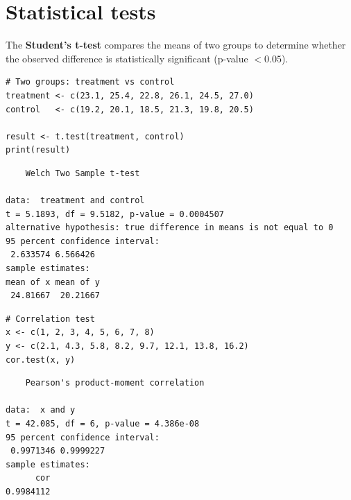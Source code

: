\section{Statistical tests}

\begin{definition}
The \textbf{Student's t-test} compares the means of two groups
to determine whether the observed difference is statistically significant
(p-value $< 0.05$).
\end{definition}

\begin{codeblock}[title=\textbf{R}]
\begin{verbatim}
# Two groups: treatment vs control
treatment <- c(23.1, 25.4, 22.8, 26.1, 24.5, 27.0)
control   <- c(19.2, 20.1, 18.5, 21.3, 19.8, 20.5)

result <- t.test(treatment, control)
print(result)
\end{verbatim}
\end{codeblock}

\begin{codeoutput}
\begin{verbatim}
	Welch Two Sample t-test

data:  treatment and control
t = 5.1893, df = 9.5182, p-value = 0.0004507
alternative hypothesis: true difference in means is not equal to 0
95 percent confidence interval:
 2.633574 6.566426
sample estimates:
mean of x mean of y
 24.81667  20.21667
\end{verbatim}
\end{codeoutput}

\begin{codeblock}[title=\textbf{R}]
\begin{verbatim}
# Correlation test
x <- c(1, 2, 3, 4, 5, 6, 7, 8)
y <- c(2.1, 4.3, 5.8, 8.2, 9.7, 12.1, 13.8, 16.2)
cor.test(x, y)
\end{verbatim}
\end{codeblock}

\begin{codeoutput}
\begin{verbatim}
	Pearson's product-moment correlation

data:  x and y
t = 42.085, df = 6, p-value = 4.386e-08
95 percent confidence interval:
 0.9971346 0.9999227
sample estimates:
      cor
0.9984112
\end{verbatim}
\end{codeoutput}

